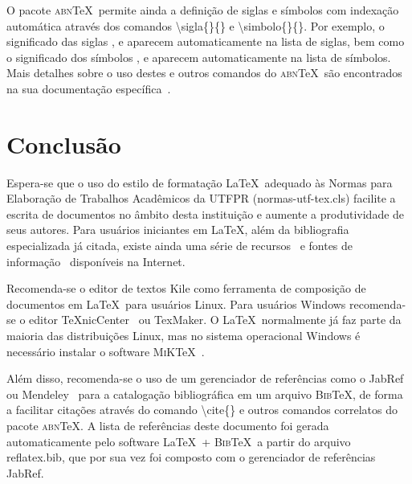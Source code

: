\documentclass[openright]{normas-utf-tex} %
\begin{document}
O pacote \textsc{abn}\TeX\ permite ainda a definição de siglas e símbolos com indexação automática através dos comandos {\ttfamily \textbackslash sigla\{\}\{\}} e {\ttfamily \textbackslash simbolo\{\}\{\}}. Por exemplo, o significado das siglas ,  e  aparecem automaticamente na lista de siglas, bem como o significado dos símbolos ,  e  aparecem automaticamente na lista de símbolos. Mais detalhes sobre o uso destes e outros comandos do \textsc{abn}\TeX\ são encontrados na sua documentação específica~\cite{abnTeX2009}.


\chapter{Conclusão}
\label{chap:conclusao}

Espera-se que o uso do estilo de formatação \LaTeX\ adequado às Normas para Elaboração de Trabalhos Acadêmicos da UTFPR ({\ttfamily normas-utf-tex.cls}) facilite a escrita de documentos no âmbito desta instituição e aumente a produtividade de seus autores. Para usuários iniciantes em \LaTeX, além da bibliografia especializada já citada, existe ainda uma série de recursos~\cite{CTAN2009} e fontes de informação~\cite{TeX-Br2009,Wikibooks2009} disponíveis na Internet.

Recomenda-se o editor de textos Kile como ferramenta de composição de documentos em \LaTeX\ para usuários Linux. Para usuários Windows recomenda-se o editor \TeX nicCenter~\cite{TeXnicCenter2009} ou TexMaker. O \LaTeX\ normalmente já faz parte da maioria das distribuições Linux, mas no sistema operacional Windows é necessário instalar o software \textsc{MiK}\TeX~\cite{MiKTeX2009}.

Além disso, recomenda-se o uso de um gerenciador de referências como o JabRef~\cite{JabRef2009} ou Mendeley~\cite{Mendeley2009} para a catalogação bibliográfica em um arquivo \textsc{Bib}\TeX, de forma a facilitar citações através do comando {\ttfamily \textbackslash cite\{\}} e outros comandos correlatos do pacote \textsc{abn}\TeX. A lista de referências deste documento foi gerada automaticamente pelo software \LaTeX\ + \textsc{Bib}\TeX\ a partir do arquivo {\ttfamily reflatex.bib}, que por sua vez foi composto com o gerenciador de referências JabRef.
\end{document}
